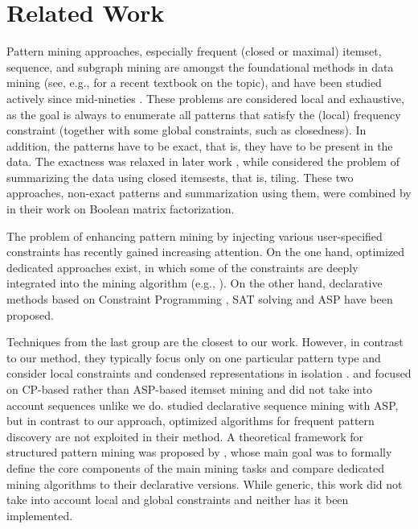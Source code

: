 
\section{Related Work}\label{sec:relwork}

Pattern mining approaches, especially frequent (closed or maximal) itemset, sequence, and subgraph mining are amongst the foundational methods in data mining (see, e.g., \textcite{aggarwal15data} for a recent textbook on the topic), and have been studied actively since mid-nineties \parencite{agrawal93mining,DBLP:books/mit/fayyadPSU96/AgrawalMSTV96}. These problems are considered local and exhaustive, as the goal is always to enumerate all patterns that satisfy the (local) frequency constraint (together with some global constraints, such as closedness). In addition, the patterns have to be exact, that is, they have to be present in the data. The exactness was relaxed in later work \parencite{pensa05towards}, while \textcite{tiling} considered the problem of summarizing the data using closed itemsests, that is, tiling. These two approaches, non-exact patterns and summarization using them, were combined by \textcite{miettinen08discrete} in their work on Boolean matrix factorization. 

The problem of enhancing pattern mining by injecting various user-specified constraints has recently gained increasing attention. On the one hand, optimized dedicated approaches exist, in which some of the constraints are deeply integrated into the mining algorithm (e.g., \textcite{DBLP:conf/kdd/PeiH00}).  On the other hand, %
declarative methods based on Constraint Programming \parencite{sky2014,DBLP:conf/cpaior/NegrevergneG15,DBLP:journals/corr/MetivierLC13}, SAT solving \parencite{DBLP:conf/pakdd/JabbourSS15,DBLP:conf/cikm/JabbourSS13} and ASP \parencite{DBLP:conf/lpnmr/Jarvisalo11,DBLP:conf/ijcai/GebserGQ0S16,DBLP:journals/corr/GuyetMQ14} have been proposed. 

Techniques from the last group are the closest to our work. However, in contrast to our method, they typically focus only on one particular pattern type and consider local constraints and condensed representations in isolation \parencite{DBLP:conf/dmkd/PeiHM00,clospan}. %
\textcite{dp2013} and \textcite{DBLP:journals/ai/GunsDNTR17} focused on CP-based rather than ASP-based itemset mining and did not take into account sequences unlike we do. \textcite{DBLP:conf/ijcai/GebserGQ0S16} studied declarative sequence mining with ASP, but in contrast to our approach, optimized algorithms for frequent pattern discovery are not exploited in their method.
A theoretical framework for structured pattern mining was proposed by \textcite{DBLP:conf/aaai/GunsPN16}, whose main goal was to formally define the core components of the main mining tasks and compare dedicated mining algorithms to their declarative versions. While generic, this work did not take into account local and global constraints and neither has it been implemented.

